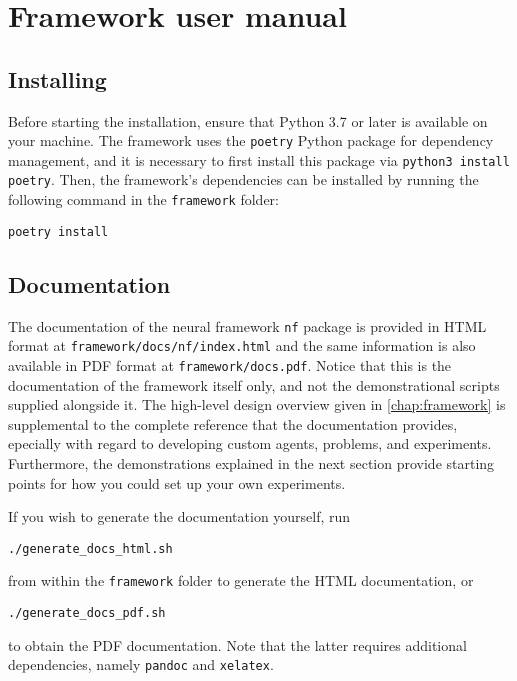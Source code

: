 \chapter{Framework user manual}
\label{app:framework_user_manual}

\section{Installing}
Before starting the installation, ensure that Python 3.7 or later is available on your machine. 
The framework uses the \texttt{poetry} Python package for dependency management, and it is necessary to first install this package via \texttt{python3 install poetry}. 
Then, the framework's dependencies can be installed by running the following command in the \texttt{framework} folder:
\begin{verbatim}
poetry install
\end{verbatim}

\section{Documentation}
The documentation of the neural framework \texttt{nf} package is provided in HTML format at \texttt{framework/docs/nf/index.html} and the same information is also available in PDF format at \texttt{framework/docs.pdf}.
Notice that this is the documentation of the framework itself only, and not the demonstrational scripts supplied alongside it.
The high-level design overview given in \ref{chap:framework} is supplemental to the complete reference that the documentation provides, epecially with regard to developing custom agents, problems, and experiments.
Furthermore, the demonstrations explained in the next section provide starting points for how you could set up your own experiments.

If you wish to generate the documentation yourself, run
\begin{verbatim}
./generate_docs_html.sh
\end{verbatim}
from within the \texttt{framework} folder to generate the HTML documentation, or
\begin{verbatim}
./generate_docs_pdf.sh
\end{verbatim}
to obtain the PDF documentation. 
Note that the latter requires additional dependencies, namely \texttt{pandoc} and \texttt{xelatex}.

